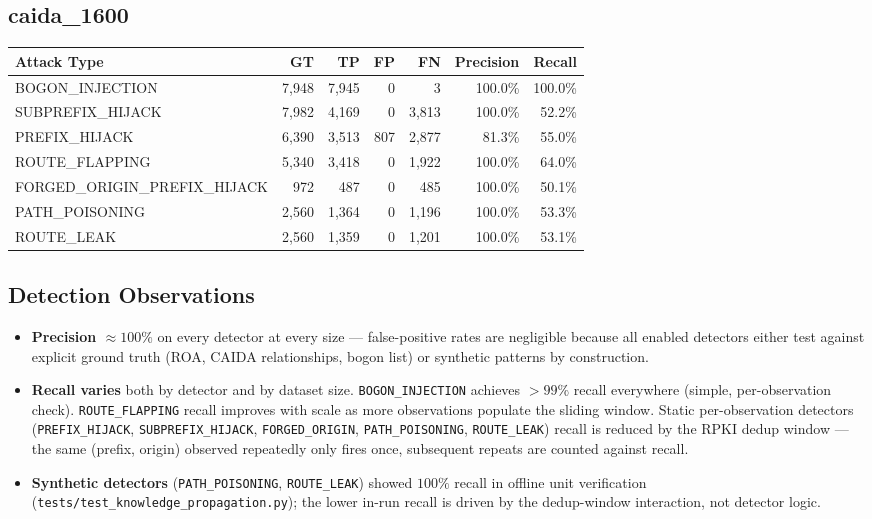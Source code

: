 \documentclass[10pt,a4paper]{article}
\begin{document}
\subsection{caida\_1600}
\begin{table}[h]
\centering
\small
\begin{tabular}{lrrrrrr}
\toprule
Attack Type & GT & TP & FP & FN & Precision & Recall \\
\midrule

BOGON\_INJECTION & 7,948 & 7,945 & 0 & 3 & 100.0\% & 100.0\% \\
SUBPREFIX\_HIJACK & 7,982 & 4,169 & 0 & 3,813 & 100.0\% & 52.2\% \\
PREFIX\_HIJACK & 6,390 & 3,513 & 807 & 2,877 & 81.3\% & 55.0\% \\
ROUTE\_FLAPPING & 5,340 & 3,418 & 0 & 1,922 & 100.0\% & 64.0\% \\
FORGED\_ORIGIN\_PREFIX\_HIJACK & 972 & 487 & 0 & 485 & 100.0\% & 50.1\% \\
PATH\_POISONING & 2,560 & 1,364 & 0 & 1,196 & 100.0\% & 53.3\% \\
ROUTE\_LEAK & 2,560 & 1,359 & 0 & 1,201 & 100.0\% & 53.1\% \\
\bottomrule
\end{tabular}
\end{table}

\subsection{Detection Observations}

\begin{itemize}
\item \textbf{Precision $\approx 100\%$} on every detector at every size --- false-positive rates are negligible because all enabled detectors either test against explicit ground truth (ROA, CAIDA relationships, bogon list) or synthetic patterns by construction.
\item \textbf{Recall varies} both by detector and by dataset size. \texttt{BOGON\_INJECTION} achieves $>99\%$ recall everywhere (simple, per-observation check). \texttt{ROUTE\_FLAPPING} recall improves with scale as more observations populate the sliding window. Static per-observation detectors (\texttt{PREFIX\_HIJACK}, \texttt{SUBPREFIX\_HIJACK}, \texttt{FORGED\_ORIGIN}, \texttt{PATH\_POISONING}, \texttt{ROUTE\_LEAK}) recall is reduced by the RPKI dedup window --- the same (prefix, origin) observed repeatedly only fires once, subsequent repeats are counted against recall.
\item \textbf{Synthetic detectors} (\texttt{PATH\_POISONING}, \texttt{ROUTE\_LEAK}) showed $100\%$ recall in offline unit verification (\texttt{tests/test\_knowledge\_propagation.py}); the lower in-run recall is driven by the dedup-window interaction, not detector logic.
\end{itemize}
\end{document}
